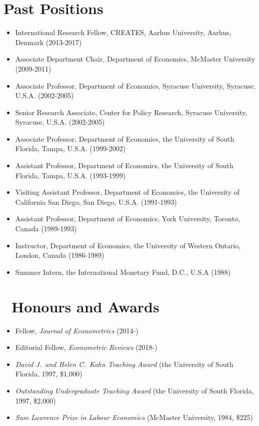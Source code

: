 \documentclass[
]{article}
\begin{document}
\section*{Past Positions}\label{past-positions}

\begin{itemize}
\item
  International Research Fellow, CREATES, Aarhus University, Aarhus,
  Denmark (2013-2017)
\item
  Associate Department Chair, Department of Economics, McMaster
  University (2009-2011)
\item
  Associate Professor, Department of Economics, Syracuse University,
  Syracuse, U.S.A. (2002-2005)
\item
  Senior Research Associate, Center for Policy Research, Syracuse
  University, Syracuse, U.S.A. (2002-2005)
\item
  Associate Professor, Department of Economics, the University of South
  Florida, Tampa, U.S.A. (1999-2002)
\item
  Assistant Professor, Department of Economics, the University of South
  Florida, Tampa, U.S.A. (1993-1999)
\item
  Visiting Assistant Professor, Department of Economics, the University
  of California San Diego, San Diego, U.S.A. (1991-1993)
\item
  Assistant Professor, Department of Economics, York University,
  Toronto, Canada (1989-1993)
\item
  Instructor, Department of Economics, the University of Western
  Ontario, London, Canada (1986-1989)
\item
  Summer Intern, the International Monetary Fund, D.C., U.S.A (1988)
\end{itemize}

\section*{\texorpdfstring{\faAward~Honours and
Awards}{~Honours and Awards}}\label{honours-and-awards}

\begin{itemize}
\item
  Fellow, \emph{Journal of Econometrics} (2014-)
\item
  Editorial Fellow, \emph{Econometric Reviews} (2018-)
\item
  \emph{David J.~and Helen C.~Kahn Teaching Award} (the University of
  South Florida, 1997, \$1,000)
\item
  \emph{Outstanding Undergraduate Teaching Award} (the University of
  South Florida, 1997, \$2,000)
\item
  \emph{Sam Lawrence Prize in Labour Economics} (McMaster University,
  1984, \$225)
\end{itemize}
\end{document}

